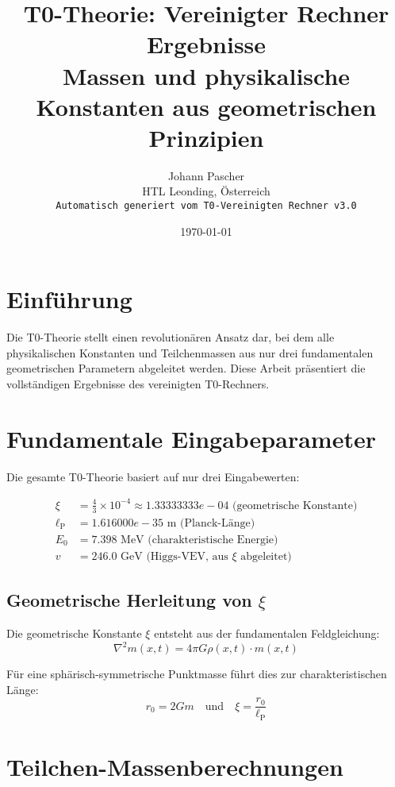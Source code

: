 \documentclass[11pt,a4paper]{article}
\title{T0-Theorie: Vereinigter Rechner Ergebnisse\\
\large Massen und physikalische Konstanten aus geometrischen Prinzipien}
\author{Johann Pascher\\HTL Leonding, Österreich\\
\texttt{Automatisch generiert vom T0-Vereinigten Rechner v3.0}}
\date{\today}
\begin{document}
\maketitle

\tableofcontents
\newpage

\section{Einführung}

Die T0-Theorie stellt einen revolutionären Ansatz dar, bei dem alle physikalischen Konstanten und Teilchenmassen aus nur drei fundamentalen geometrischen Parametern abgeleitet werden. Diese Arbeit präsentiert die vollständigen Ergebnisse des vereinigten T0-Rechners.

\section{Fundamentale Eingabeparameter}

Die gesamte T0-Theorie basiert auf nur drei Eingabewerten:

\begin{align}
\xi &= \frac{4}{3} \times 10^{-4} \approx 1.33333333e-04 \text{ (geometrische Konstante)} \\
\ell_\text{P} &= 1.616000e-35 \text{ m (Planck-Länge)} \\
E_0 &= 7.398 \text{ MeV (charakteristische Energie)} \\
v &= 246.0 \text{ GeV (Higgs-VEV, aus } \xi \text{ abgeleitet)}
\end{align}

\subsection{Geometrische Herleitung von $\xi$}

Die geometrische Konstante $\xi$ entsteht aus der fundamentalen Feldgleichung:
\begin{equation}
\nabla^2 m(x,t) = 4\pi G \rho(x,t) \cdot m(x,t)
\end{equation}

Für eine sphärisch-symmetrische Punktmasse führt dies zur charakteristischen Länge:
\begin{equation}
r_0 = 2Gm \quad \text{und} \quad \xi = \frac{r_0}{\ell_\text{P}}
\end{equation}

\section{Teilchen-Massenberechnungen}
\end{document}

